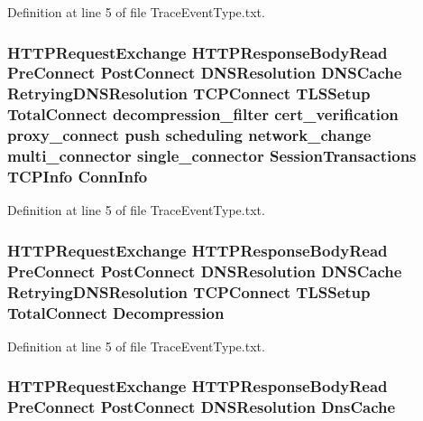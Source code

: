 Definition at line 5 of file Trace\+Event\+Type.\+txt.

\subsubsection[{Conn\+Info}]{ H\+T\+T\+P\+Request\+Exchange H\+T\+T\+P\+Response\+Body\+Read {\bf Pre\+Connect} {\bf Post\+Connect} D\+N\+S\+Resolution D\+N\+S\+Cache Retrying\+D\+N\+S\+Resolution T\+C\+P\+Connect T\+L\+S\+Setup {\bf Total\+Connect} decompression\+\_\+filter cert\+\_\+verification proxy\+\_\+connect push scheduling network\+\_\+change multi\+\_\+connector single\+\_\+connector {\bf Session\+Transactions} {\bf T\+C\+P\+Info} Conn\+Info}\label{TraceEventType_8txt_a1c66fc07a12d30a63dcfdd4ef7e75ae1}


Definition at line 5 of file Trace\+Event\+Type.\+txt.

\subsubsection[{Decompression}]{ H\+T\+T\+P\+Request\+Exchange H\+T\+T\+P\+Response\+Body\+Read {\bf Pre\+Connect} {\bf Post\+Connect} D\+N\+S\+Resolution D\+N\+S\+Cache Retrying\+D\+N\+S\+Resolution T\+C\+P\+Connect T\+L\+S\+Setup {\bf Total\+Connect} Decompression}\label{TraceEventType_8txt_a4b5404c0d1579e7b4e8da6f99d88bc71}


Definition at line 5 of file Trace\+Event\+Type.\+txt.

\subsubsection[{Dns\+Cache}]{ H\+T\+T\+P\+Request\+Exchange H\+T\+T\+P\+Response\+Body\+Read {\bf Pre\+Connect} {\bf Post\+Connect} D\+N\+S\+Resolution Dns\+Cache}\label{TraceEventType_8txt_a6cd5ea99eeeb04f4a30bad151d4b7da4}


